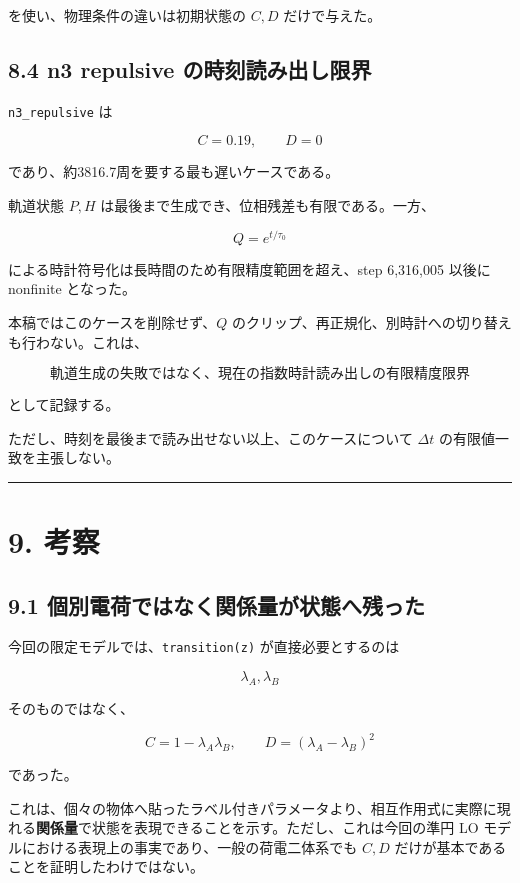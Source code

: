 \documentclass[
  a4paper,
]{ltjsarticle}
\begin{document}
を使い、物理条件の違いは初期状態の \(C,D\) だけで与えた。

\subsection{8.4 n3 repulsive
の時刻読み出し限界}\label{n3-repulsive-ux306eux6642ux523bux8aadux307fux51faux3057ux9650ux754c}

\texttt{n3\_repulsive} は

\[
C=0.19,
\qquad
D=0
\]

であり、約3816.7周を要する最も遅いケースである。

軌道状態 \(P,H\) は最後まで生成でき、位相残差も有限である。一方、

\[
Q=e^{t/\tau_0}
\]

による時計符号化は長時間のため有限精度範囲を超え、step 6,316,005 以後に
nonfinite となった。

本稿ではこのケースを削除せず、\(Q\)
のクリップ、再正規化、別時計への切り替えも行わない。これは、

\[
\boxed{
\text{軌道生成の失敗ではなく、現在の指数時計読み出しの有限精度限界}
}
\]

として記録する。

ただし、時刻を最後まで読み出せない以上、このケースについて \(\Delta t\)
の有限値一致を主張しない。

\begin{center}\rule{0.5\linewidth}{0.5pt}\end{center}

\section{9. 考察}\label{ux8003ux5bdf}

\subsection{9.1
個別電荷ではなく関係量が状態へ残った}\label{ux500bux5225ux96fbux8377ux3067ux306fux306aux304fux95a2ux4fc2ux91cfux304cux72b6ux614bux3078ux6b8bux3063ux305f}

今回の限定モデルでは、\texttt{transition(z)} が直接必要とするのは

\[
\lambda_A,
\lambda_B
\]

そのものではなく、

\[
C=1-\lambda_A\lambda_B,
\qquad
D=(\lambda_A-\lambda_B)^2
\]

であった。

これは、個々の物体へ貼ったラベル付きパラメータより、相互作用式に実際に現れる\textbf{関係量}で状態を表現できることを示す。ただし、これは今回の準円
LO モデルにおける表現上の事実であり、一般の荷電二体系でも \(C,D\)
だけが基本であることを証明したわけではない。
\end{document}

